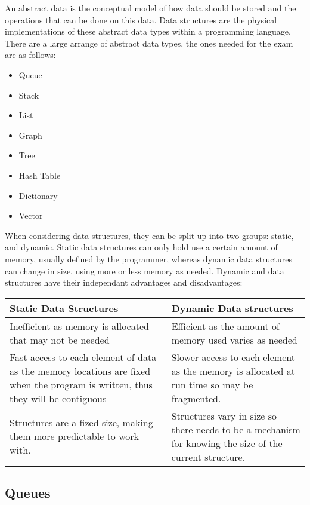   
  An abstract data is the conceptual model of how data should be stored and the operations that can be done on this data. Data structures are the physical implementations of these abstract data types within a programming language. There are a large arrange of abstract data types, the ones needed for the exam are as follows:
  \begin{itemize}
  	\item Queue
  	\item Stack
  	\item List
  	\item Graph
  	\item Tree
  	\item Hash Table
  	\item Dictionary
  	\item Vector
  \end{itemize}
  When considering data structures, they can be split up into two groups: static, and dynamic. Static data structures can only hold use a certain amount of memory, usually defined by the programmer, whereas dynamic data structures can change in size, using more or less memory as needed. Dynamic and data structures have their independant advantages and disadvantages:
  \begin{table}[H]
  	\begin{tabular}{| C{7cm} | C{7cm} |}
  		\hline
  		\textbf{Static Data Structures} & \textbf{Dynamic Data structures} \\\hline
  		Inefficient as memory is allocated that may not be needed & Efficient as the amount of memory used varies as needed \\\hline
  		Fast access to each element of data as the memory locations are fixed when the program is written, thus they will be contiguous & Slower access to each element as the memory is allocated at run time so may be fragmented. \\\hline
  		Structures are a fized size, making them more predictable to work with. & Structures vary in size so there needs to be a mechanism for knowing the size of the current structure. \\\hline
  	\end{tabular}
  \end{table}
\subsection{Queues}
  
